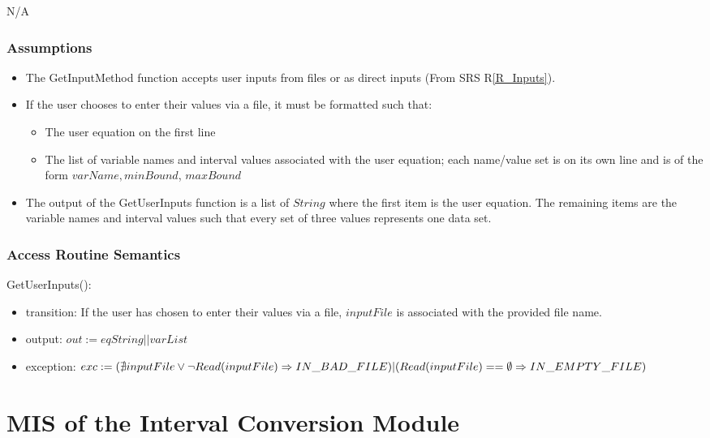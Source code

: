 \documentclass[12pt, titlepage]{article}
\newcommand{\rref}[1]{R\ref{#1}}
\begin{document}
N/A

\subsubsection{Assumptions}

\begin{itemize}
	\item The GetInputMethod function accepts user inputs from files or as 
	direct inputs (From SRS \rref{R_Inputs}).
	
	\item If the user chooses to enter their values via a file, it must be 
	formatted such that:	
	\begin{itemize}
		\item The user equation on the first line
		\item The list of variable names and interval values associated with 
		the user equation; each name/value set is on its own line and is of the 
		form $varName, minBound$, $maxBound$
	\end{itemize}

	\item The output of the GetUserInputs function is a list of $String$ where 
	the first item is the user equation. The remaining items are the variable 
	names and interval values such that every set of three values represents 
	one data set. 
\end{itemize}


\subsubsection{Access Routine Semantics}

\noindent GetUserInputs():
\begin{itemize}
	\item transition: If the user has chosen to enter their values via a file, 
	$inputFile$ is associated with the provided file name.
	\item output: $out := eqString || varList$
	\item exception: $exc := \\
	(\nexists inputFile \vee \neg Read(inputFile) \Rightarrow IN\_BAD\_FILE)\\
	|\\
	(Read(inputFile) == \emptyset \Rightarrow IN\_EMPTY\_FILE)$
\end{itemize}

\newpage

\section{MIS of the Interval Conversion Module} 
\label{Module_intervalconversion}
\end{document}
